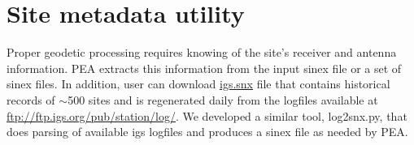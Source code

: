 




\section{Site metadata utility}\label{log2snx}

Proper geodetic processing requires knowing of the site's receiver and antenna information. PEA extracts this information from the input sinex file or a set of sinex files. In addition, user can download \href{ftp://igs.ensg.ign.fr/pub/igs/igscb/station/general/igs.snx}{igs.snx} file that contains historical records of $\sim$500 sites and is regenerated daily from the logfiles available at \url{ftp://ftp.igs.org/pub/station/log/}. We developed a similar tool, log2snx.py, that does parsing of available igs logfiles and produces a sinex file as needed by PEA.

